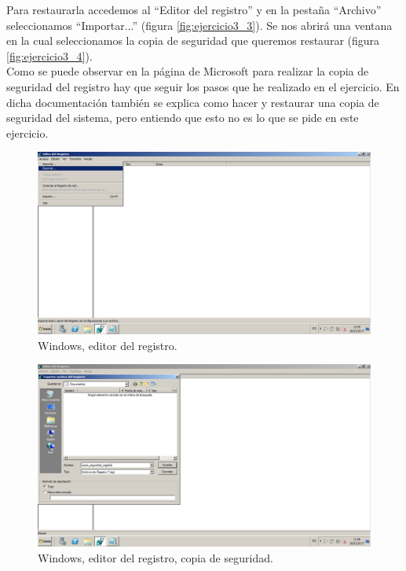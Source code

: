 Para restaurarla accedemos al ``Editor del registro'' y en la pestaña ``Archivo'' seleccionamos ``Importar...'' (figura \ref{fig:ejercicio3_3}). Se nos abrirá una ventana en la cual seleccionamos la copia de seguridad que queremos restaurar (figura \ref{fig:ejercicio3_4}).\\

Como se puede observar en la página de Microsoft \cite{ejer3} para realizar la copia de seguridad del registro hay que seguir los pasos que he realizado en el ejercicio. En dicha documentación también se explica como hacer y restaurar una copia de seguridad del sistema, pero entiendo que esto no es lo que se pide en este ejercicio.

\begin{figure}[H] 
	\centering
	\includegraphics[width=14.7cm]{./img/ejercicio3_1.png} 	
	\caption{Windows, editor del registro.} \label{fig:ejercicio3_1}
\end{figure}

\begin{figure}[H] 
	\centering
	\includegraphics[width=14.7cm]{./img/ejercicio3_2.png} 	
	\caption{Windows, editor del registro, copia de seguridad.} \label{fig:ejercicio3_2}
\end{figure}

